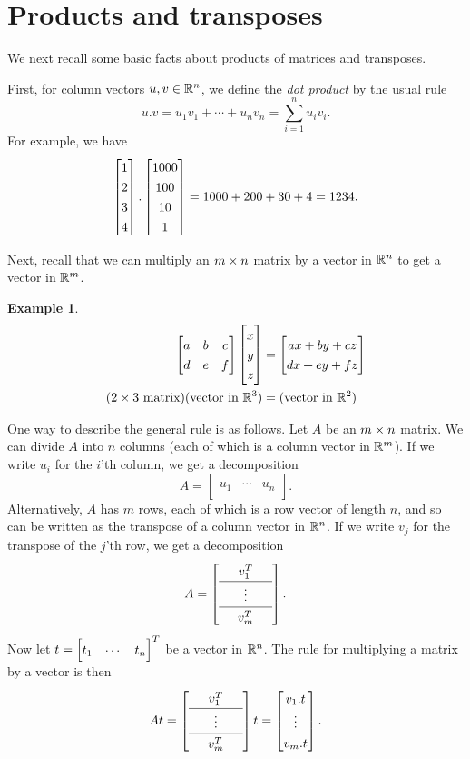 \documentclass[reqno]{amsart}
\theoremstyle{definition}
\newtheorem{example}[theorem]{Example}
\newcommand{\dfn}[1]{\emph{{#1}}\index{#1}}
\begin{document}
\section{Products and transposes}
\label{sec-products}

We next recall some basic facts about products of matrices and
transposes.

First, for column vectors $u,v\in{\mathbb{R}}^n$, we define the \dfn{dot
 product} by the usual rule
\[ u.v = u_1v_1 + \dotsb + u_nv_n = \sum_{i=1}^n u_iv_i. \]
For example, we have
\[ \bbm 1 \\ 2 \\ 3 \\ 4 \ebm .
   \bbm 1000 \\ 100 \\ 10 \\ 1 \ebm =
    1000 + 200 + 30 + 4 = 1234.
\]

Next, recall that we can multiply an $m\times n$ matrix by a vector in
${\mathbb{R}}^n$ to get a vector in ${\mathbb{R}}^m$.  
\begin{example}\label{eg-At-i}
 \begin{align*}
  \bbm a & b & c \\ d & e & f \ebm \bbm x \\ y \\ z \ebm &= 
     \bbm ax+by+cz \\ dx+ey+fz \ebm \\
  \text{($2\tm 3$ matrix)}\text{(vector in $\R^3$)}
   &= \text{(vector in $\R^2$)}
 \end{align*}
\end{example}

One way to describe the general rule is as follows.  Let $A$ be an
$m\times n$ matrix.  We can divide $A$ into $n$ columns (each of
which is a column vector in ${\mathbb{R}}^m$).  If we write $u_i$ for the $i$'th
column, we get a decomposition
\[ A = \left[\begin{array}{c|c|c}
        && \\ u_1 & \dotsb & u_n \\ &&
       \end{array}\right].
\]
Alternatively, $A$ has $m$ rows, each of which is a row vector
of length $n$, and so can be written as the transpose of a column
vector in ${\mathbb{R}}^n$.  If we write $v_j$ for the transpose of the $j$'th
row, we get a decomposition
\[ \renewcommand{\arraystretch}{1.3}
   A = \left[\begin{array}{ccc}
        & v_1^T & \\ \hline
        & \vdots & \\ \hline
        & v_m^T &
       \end{array}\right].
\]
Now let $t=\bbm t_1 & \dotsb & t_n\ebm^T$ be a vector in ${\mathbb{R}}^n$.  The
rule for multiplying a matrix by a vector is then
\[ \renewcommand{\arraystretch}{1.3}
   At = 
    \left[\begin{array}{ccc}
        & v_1^T & \\ \hline
        & \vdots & \\ \hline
        & v_m^T &
       \end{array}\right] t = 
    \bbm v_1.t \\ \vdots \\ v_m.t \ebm.
\] 
\end{document}
